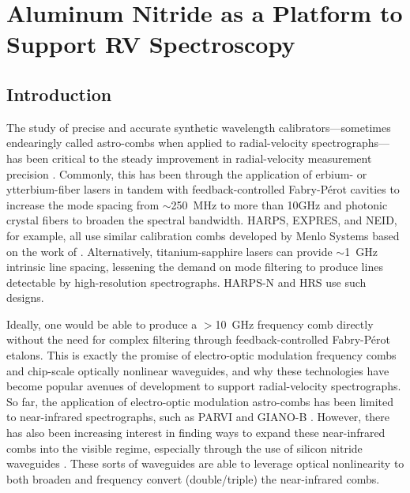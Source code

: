 \chapter{Aluminum Nitride as a Platform to Support RV Spectroscopy} \label{chapter:astro-comb}

\section{Introduction} \label{astro-comb:intro}

The study of precise and accurate synthetic wavelength calibrators---sometimes endearingly called astro-combs when applied to radial-velocity spectrographs---has been critical to the steady improvement in radial-velocity measurement precision \citep{mccracken_decade_2017}. Commonly, this has been through the application of erbium- or ytterbium-fiber lasers in tandem with feedback-controlled Fabry-P\'erot cavities to increase the mode spacing from $\sim$250~\si{\mega\hertz} to more than 10\si{\giga\hertz} and photonic crystal fibers to broaden the spectral bandwidth. HARPS, EXPRES, and NEID, for example, all use similar calibration combs developed by Menlo Systems based on the work of \citet{probst_laser_2014}. Alternatively, titanium-sapphire lasers can provide $\sim$1~\si{\giga\hertz} intrinsic line spacing, lessening the demand on mode filtering to produce lines detectable by high-resolution spectrographs. HARPS-N \citep{doerr_performance_2012} and HRS \citep{mccracken_wavelength_2017} use such designs.

Ideally, one would be able to produce a $>$10~\si{\giga\hertz} frequency comb directly without the need for complex filtering through feedback-controlled Fabry-P\'erot etalons. This is exactly the promise of electro-optic modulation frequency combs and chip-scale optically nonlinear waveguides, and why these technologies have become popular avenues of development to support radial-velocity spectrographs. So far, the application of electro-optic modulation astro-combs has been limited to near-infrared spectrographs, such as PARVI \citep{yi_demonstration_2016} and GIANO-B \citep{obrzud_broadband_2018}. However, there has also been increasing interest in finding ways to expand these near-infrared combs into the visible regime, especially through the use of silicon nitride waveguides \citep{carlson_ultrafast_2017, obrzud_visible_2019}. These sorts of waveguides are able to leverage optical nonlinearity to both broaden and frequency convert (double/triple) the near-infrared combs.

